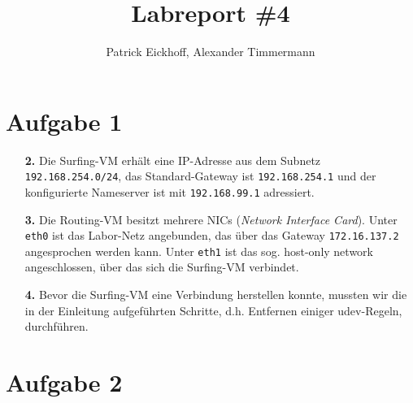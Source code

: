 \documentclass{scrartcl}
\author{Patrick Eickhoff, Alexander Timmermann}
\title{Labreport \#4}
\date{}
\begin{document}
    \maketitle
    \section*{Aufgabe 1}
    \label{sec:Aufgabe 1}

    \begin{enumerate}[\textbf{1.}]
        \item[\bf 2.] Die Surfing-VM erhält eine IP-Adresse aus dem Subnetz \texttt{192.168.254.0/24},
                      das Standard-Gateway ist \texttt{192.168.254.1} und der
                      konfigurierte Nameserver ist mit \texttt{192.168.99.1}
                      adressiert.
        \item[\bf 3.] Die Routing-VM besitzt mehrere NICs (\textit{Network Interface Card}).
                      Unter \texttt{eth0} ist das Labor-Netz angebunden, das über das
                      Gateway \texttt{172.16.137.2} angesprochen werden kann.
                      Unter \texttt{eth1} ist das sog. host-only network angeschlossen,
                      über das sich die Surfing-VM verbindet.
        \item[\bf 4.] Bevor die Surfing-VM eine Verbindung herstellen konnte, mussten wir
                      die in der Einleitung aufgeführten Schritte, d.h. Entfernen einiger
                      udev-Regeln, durchführen.
    \end{enumerate}

    \section{Aufgabe 2}
    \label{sec:Aufgabe 2}
\end{document}
